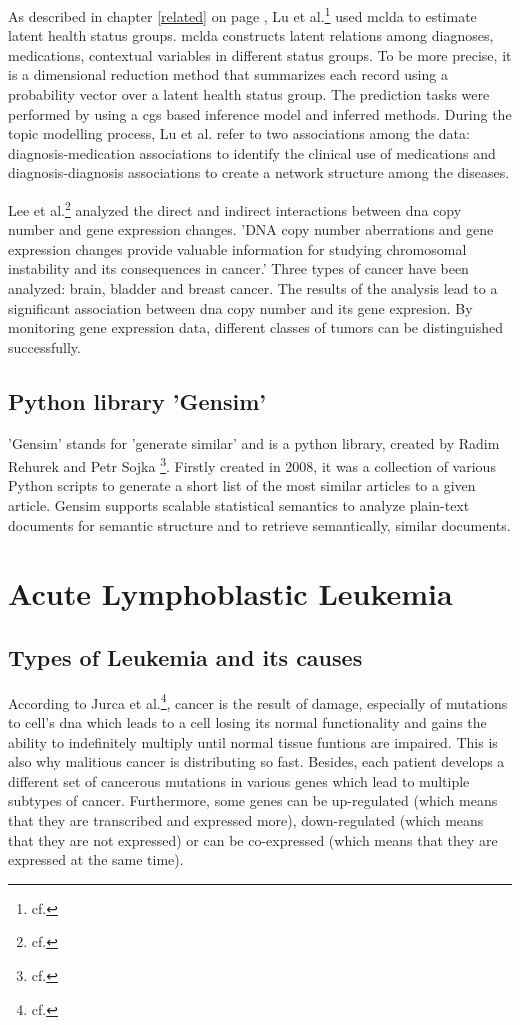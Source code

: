 As described in chapter \ref{related} on page \pageref{related}, Lu et al.\footnote{cf.\autocite{lu_2016}} used \gls{mclda} to estimate latent health status groups. \gls{mclda} constructs latent relations among diagnoses, medications, contextual variables in different status groups. To be more precise, it is a dimensional reduction method that summarizes each record using a probability vector over a latent health status group. The prediction tasks were performed by using a \gls{cgs} based inference model and inferred methods. 
During the topic modelling process, Lu et al. refer to two associations among the data: diagnosis-medication associations to identify the clinical use of medications and diagnosis-diagnosis associations to create a network structure among the diseases.

Lee et al.\footnote{cf.\autocite{lee}} analyzed the direct and indirect interactions between \gls{dna} copy number and gene expression changes. 'DNA copy number aberrations and gene expression changes provide valuable information for studying chromosomal instability and its consequences in cancer.' Three types of cancer have been analyzed: brain, bladder and breast cancer. The results of the analysis lead to a significant association between \gls{dna} copy number and its gene expresion. By monitoring gene expression data, different classes of tumors can be distinguished successfully.
  
\section{Python library 'Gensim'}\label{gensim}
'Gensim' stands for 'generate similar' and is a python library, created by Radim Rehurek and Petr Sojka \footnote{cf.\autocite{gensim}}. Firstly created in  2008, it was a collection of various Python scripts to generate a short list of the most similar articles to a given article. Gensim supports scalable statistical semantics to analyze plain-text documents for semantic structure and to retrieve semantically, similar documents.            
              
\chapter{Acute Lymphoblastic Leukemia}\label{all}
\section{Types of Leukemia and its causes}\label{leukemia_types}
According to Jurca et al.\footnote{cf.\autocite{jurca_2016}}, cancer is the result of damage, especially of mutations to cell's \gls{dna} which leads to a cell losing its normal functionality and gains the ability to indefinitely multiply until normal tissue funtions are impaired. This is also why malitious cancer is distributing so fast. Besides, each patient develops a different set of cancerous mutations in various genes which lead to multiple subtypes of cancer.
Furthermore, some genes can be up-regulated (which means that they are transcribed and expressed more), down-regulated (which means that they are not expressed) or can be co-expressed (which means that they are expressed at the same time).


